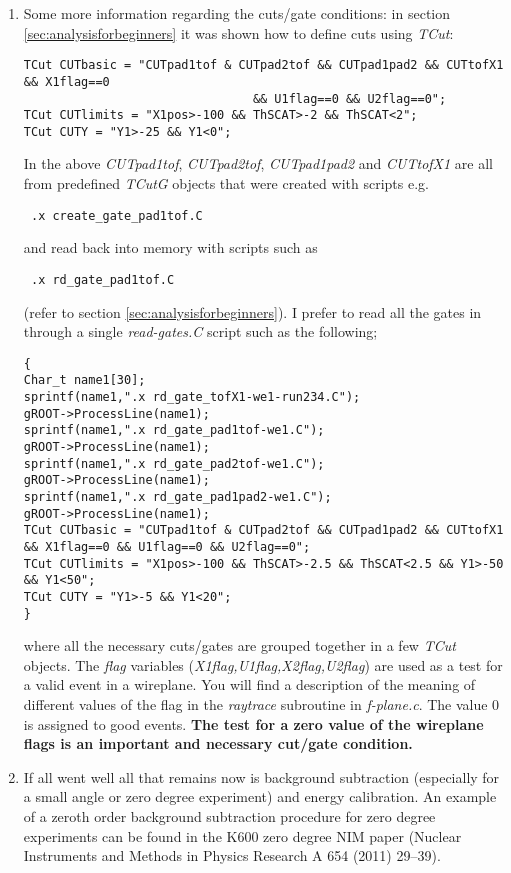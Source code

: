 \documentclass[11pt]{report}
\begin{document}
\begin{enumerate}
\item Some more information regarding the cuts/gate conditions:
in section \ref{sec:analysisforbeginners} it was shown how to define cuts using {\it TCut}:
\begin{verbatim}
TCut CUTbasic = "CUTpad1tof & CUTpad2tof && CUTpad1pad2 && CUTtofX1 && X1flag==0 
								&& U1flag==0 && U2flag==0";
TCut CUTlimits = "X1pos>-100 && ThSCAT>-2 && ThSCAT<2";
TCut CUTY = "Y1>-25 && Y1<0";  
\end{verbatim}
In the above {\it CUTpad1tof}, {\it CUTpad2tof}, {\it CUTpad1pad2} and  {\it CUTtofX1}
are all from predefined {\it TCutG} objects that were created with scripts e.g.
\begin{verbatim} .x create_gate_pad1tof.C  \end{verbatim}
and read back into memory with scripts such as
\begin{verbatim} .x rd_gate_pad1tof.C  \end{verbatim}
(refer to section \ref{sec:analysisforbeginners}).
I prefer to read all the gates in through a single {\it read-gates.C} script
such as the following;
\begin{verbatim}
{
Char_t name1[30];
sprintf(name1,".x rd_gate_tofX1-we1-run234.C");
gROOT->ProcessLine(name1);
sprintf(name1,".x rd_gate_pad1tof-we1.C");
gROOT->ProcessLine(name1);
sprintf(name1,".x rd_gate_pad2tof-we1.C");
gROOT->ProcessLine(name1);
sprintf(name1,".x rd_gate_pad1pad2-we1.C");
gROOT->ProcessLine(name1);
TCut CUTbasic = "CUTpad1tof & CUTpad2tof && CUTpad1pad2 && CUTtofX1 && X1flag==0 && U1flag==0 && U2flag==0";
TCut CUTlimits = "X1pos>-100 && ThSCAT>-2.5 && ThSCAT<2.5 && Y1>-50 && Y1<50";
TCut CUTY = "Y1>-5 && Y1<20";      
}
\end{verbatim}
where all the necessary cuts/gates are grouped together in a few {\it TCut} objects.
The {\it flag} variables ({\it X1flag,U1flag,X2flag,U2flag}) are used as a test for a valid event in a wireplane.
You will find a description of the meaning of different values of the flag in the {\it raytrace} subroutine 
in {\it f-plane.c}. The value 0 is assigned to good events.
{\bf The test for a zero value of the wireplane flags is an important and necessary cut/gate condition.}

\item If all went well all that remains now is background subtraction (especially for a small angle or
zero degree experiment) and energy calibration.
An example of a zeroth order background subtraction procedure for zero degree experiments can be found in the
K600 zero degree NIM paper (Nuclear Instruments and Methods in Physics Research A 654 (2011) 29–39).

\end{enumerate}
\end{document}
